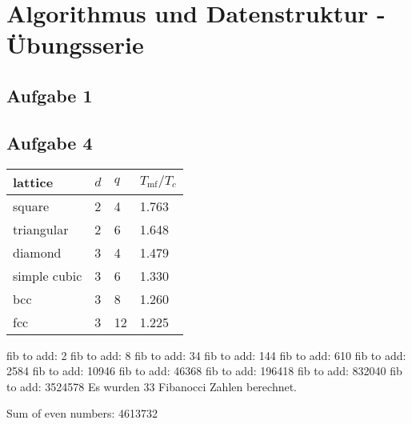 \chapter*{Algorithmus und Datenstruktur - Übungsserie}

\section*{Aufgabe 1}


\section*{Aufgabe 4}

\begin{table}[ht]
\centering
\small\renewcommand{\arraystretch}{1.4}  
%
\label{tab:IsingModel}
%
\begin{tabularx}{0.5\textwidth}{lXXX}
\hline
\rowcolor{tableheadcolor}
lattice & $d$ & $q$ & $T_\text{mf}/T_c$ \\
\hline
square  & 2 & 4 & 1.763 \\
%
triangular & 2 & 6 & 1.648 \\
%
diamond & 3 & 4 & 1.479 \\
%
simple cubic & 3 & 6 & 1.330 \\
%
bcc & 3 & 8 & 1.260 \\
%
fcc & 3 & 12 & 1.225 \\
\hline
\end{tabularx}
\end{table}

fib to add: 2
fib to add: 8
fib to add: 34
fib to add: 144
fib to add: 610
fib to add: 2584
fib to add: 10946
fib to add: 46368
fib to add: 196418
fib to add: 832040
fib to add: 3524578
Es wurden 33 Fibanocci Zahlen berechnet.

Sum of even numbers: 4613732